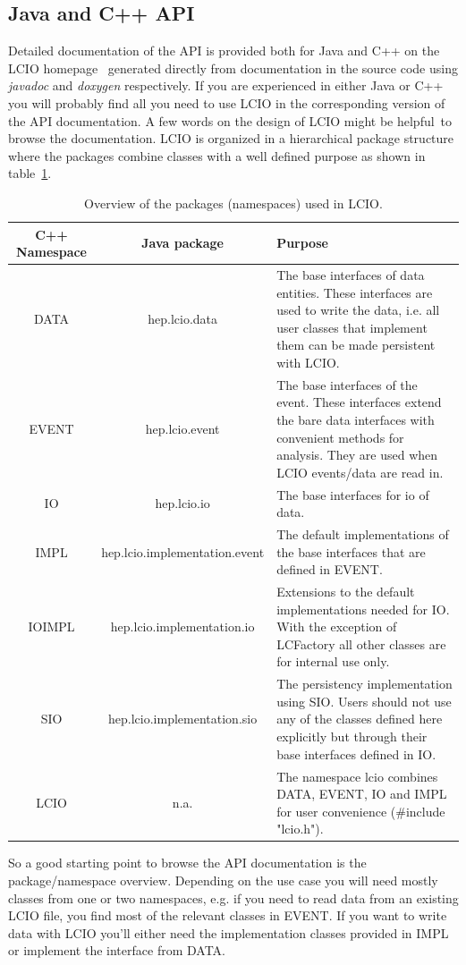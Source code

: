 \documentclass[twoside]{article}
\begin{document}
\subsection{Java and C++ API} \label{sec_api}
Detailed documentation of the API is provided both for Java and C++ on the 
LCIO homepage~\cite{lcio_home} generated directly  from documentation in the source code using 
{\em javadoc} and {\em doxygen} respectively.   
If you are experienced in either Java or C++ you will probably 
find all you need to use LCIO in the corresponding version of the API documentation.
A few words on the design of LCIO might be helpful\ to browse the documentation.
LCIO is organized in a hierarchical package structure where the packages combine classes
with a well defined purpose as shown in table~\ref{tab_pkg}.  
\begin{table}[h]
\begin{center}
\begin{tabular}{|c|c|p{6cm}|}
\hline
\rule[-5mm]{0mm}{10mm} C++ Namespace  &  Java package    &  Purpose \\ \hline \hline

 DATA  &  hep.lcio.data   &  The base interfaces of data entities.
 These interfaces are used to write the data, i.e. all user classes 
 that implement them can be made persistent with LCIO.\\ \hline
 EVENT  &  hep.lcio.event   & The base interfaces of the event.
 These interfaces extend the bare data interfaces with convenient 
 methods for analysis. They are used when LCIO events/data are read in. \\ \hline
 IO  &  hep.lcio.io   &  The base interfaces for io of data.\\ \hline
 IMPL  &  hep.lcio.implementation.event   & The default implementations of
 the base interfaces that are defined in EVENT. \\ \hline
 IOIMPL  &  hep.lcio.implementation.io   &  Extensions to the default implementations
 needed for IO. With the exception of LCFactory all other classes are for internal use only.\\ \hline
 SIO  &  hep.lcio.implementation.sio   & The persistency implementation using SIO.
 Users should not use any of the classes defined here explicitly but through their
 base interfaces defined in IO. \\ \hline
 LCIO  &   n.a. & The namespace lcio combines DATA, EVENT, IO and IMPL for user convenience
(\#include "lcio.h"). \\ \hline

\end{tabular}
\end{center}
\caption{Overview of the packages (namespaces) used in LCIO.}
\label{tab_pkg}
\end{table}
So a good starting point to browse the API documentation is the package/namespace overview.
Depending on the use case you will need mostly classes from one or two namespaces, e.g. if you need 
to read data from an existing LCIO file, you find most of the relevant classes in EVENT.
If you want to write data with LCIO you'll either need the implementation classes provided in IMPL
or implement the interface from DATA.
\end{document}
